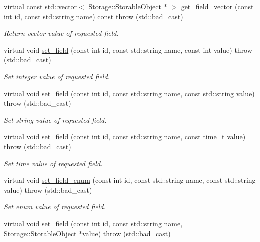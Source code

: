 \begin{DoxyCompactItemize}
virtual const std::vector$<$ \hyperlink{classStorage_1_1StorableObject}{Storage::StorableObject} $\ast$ $>$ \hyperlink{classDummyStorage_afe36af3f3147027ebb6447192201c790}{get\_\-field\_\-vector} (const int id, const std::string name) const   throw (std::bad\_\-cast)
\begin{DoxyCompactList}\small\item\em Return vector value of requested field. \item\end{DoxyCompactList}\item 
virtual void \hyperlink{classDummyStorage_ab22488d00b8969af5356bc344672bd18}{set\_\-field} (const int id, const std::string name, const int value)  throw (std::bad\_\-cast)
\begin{DoxyCompactList}\small\item\em Set integer value of requested field. \item\end{DoxyCompactList}\item 
virtual void \hyperlink{classDummyStorage_aaa0d3249ea3207fae78253b191b80854}{set\_\-field} (const int id, const std::string name, const std::string value)  throw (std::bad\_\-cast)
\begin{DoxyCompactList}\small\item\em Set string value of requested field. \item\end{DoxyCompactList}\item 
virtual void \hyperlink{classDummyStorage_a51662a853e821fda1828e8756d58f1df}{set\_\-field} (const int id, const std::string name, const time\_\-t value)  throw (std::bad\_\-cast)
\begin{DoxyCompactList}\small\item\em Set time value of requested field. \item\end{DoxyCompactList}\item 
virtual void \hyperlink{classDummyStorage_a0655a6f7c822adbe174d1c7fe7c9ea34}{set\_\-field\_\-enum} (const int id, const std::string name, const std::string value)  throw (std::bad\_\-cast)
\begin{DoxyCompactList}\small\item\em Set enum value of requested field. \item\end{DoxyCompactList}\item 
virtual void \hyperlink{classDummyStorage_ae2e39a3cee22fd90790a7528f0c7ad59}{set\_\-field} (const int id, const std::string name, \hyperlink{classStorage_1_1StorableObject}{Storage::StorableObject} $\ast$value)  throw (std::bad\_\-cast)

\end{DoxyCompactItemize}
